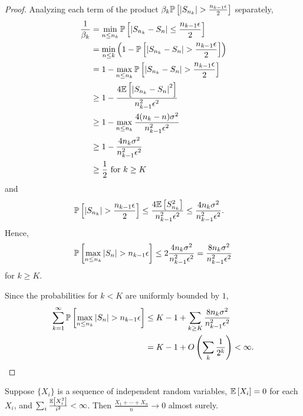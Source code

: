 \begin{proof}
	Analyzing each term of the product $\beta_k \P\left[\left| S_{n_k} \right| > \frac{n_{k-1}\epsilon}{2}\right] $ separately,
		\begin{align*}
			\frac{1}{\beta_k} &= \min_{n \le n_k} \P\left[\left| S_{n_k} - S_n \right| \le \frac{n_{k-1}\epsilon}{2}\right]  \\
							  &= \min_{n \le k} \left( 1- \P\left[\left| S_{n_k} - S_n \right| > \frac{n_{k-1}\epsilon}{2}\right]  \right) \\
						  &= 1 -\max_{n \le n_k} \P\left[\left| S_{n_k} - S_n \right| > \frac{n_{k-1}\epsilon}{2}\right] \\
						  &\ge 1- \frac{4 \E\left[\left| S_{n_k} - S_n \right|^2\right] }{n_{k-1}^2\epsilon^2} \\
						  &\ge 1 - \max_{n \le n_k} \frac{4 (n_k - n)\sigma^2}{n_{k-1}^2 \epsilon^2} \\
						  &\ge 1 - \frac{4n_k \sigma^2}{n_{k-1}^2\epsilon^2} \\
						  &\ge \frac{1}{2} \text{ for } k \ge K
	\end{align*} and
	\begin{align*}
		\P\left[\left| S_{n_k}\right| > \frac{n_{k-1}\epsilon}{2}\right] &\le \frac{4 \E\left[S_{n_k}^2\right] }{n_{k-1}^2 \epsilon^2} \le \frac{4 n_k \sigma^2}{n_{k-1}^2 \epsilon^2}
	.\end{align*}
	Hence, 
	\begin{align*}
		\P\left[\max_{n \le n_k} \left| S_n \right| > n_{k-1}\epsilon\right] \le 2 \frac{4 n_k \sigma^2}{n_{k-1}^2\epsilon^2} = \frac{8 n_k \sigma^2}{n_{k-1}^2\epsilon^2}
	\end{align*} for $k \ge K$.

	Since the probabilities for $k < K$ are uniformly bounded by $1$,
	\begin{align*}
		\sum\limits_{k=1}^{\infty} \P\left[\max_{n \le n_{k}} \left| S_n \right| > n_{k-1}\epsilon\right] &\le K - 1 + \sum\limits_{k \ge K}^{} \frac{8 n_k \sigma^2}{n_{k-1}^2 \epsilon^2} \\
																												   &= K - 1 + O\left( \sum_k \frac{1}{2^k} \right)< \infty
	.\end{align*}
\end{proof}

\begin{theorem}
	Suppose $\{X_i\}$ is a sequence of independent random variables, $\E\left[X_i\right] = 0$ for each $X_i$, and $\sum_i \frac{\E\left[X_i^2\right] }{i^2} < \infty$. Then $\frac{X_1+\cdots+X_n}{n}\to 0$ almost surely.
\end{theorem}

